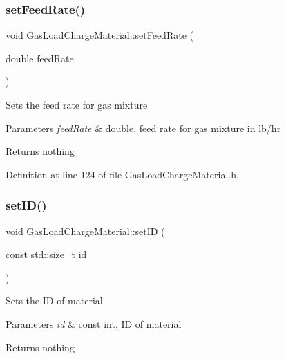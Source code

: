 \subsubsection{\texorpdfstring{set\+Feed\+Rate()}{setFeedRate()}\hspace{0.1cm}{\footnotesize\ttfamily [3/3]}}
{\footnotesize\ttfamily void Gas\+Load\+Charge\+Material\+::set\+Feed\+Rate (\begin{DoxyParamCaption}\item[{double}]{feed\+Rate }\end{DoxyParamCaption})\hspace{0.3cm}{\ttfamily [inline]}}

Sets the feed rate for gas mixture


\begin{DoxyParams}{Parameters}
{\em feed\+Rate} & double, feed rate for gas mixture in lb/hr\\
\hline
\end{DoxyParams}
\begin{DoxyReturn}{Returns}
nothing 
\end{DoxyReturn}


Definition at line 124 of file Gas\+Load\+Charge\+Material.\+h.

\mbox{\label{class_gas_load_charge_material_a24b43ba7c871453258f458a8c1f15232}} 
\subsubsection{\texorpdfstring{set\+I\+D()}{setID()}\hspace{0.1cm}{\footnotesize\ttfamily [1/3]}}
{\footnotesize\ttfamily void Gas\+Load\+Charge\+Material\+::set\+ID (\begin{DoxyParamCaption}\item[{const std\+::size\+\_\+t}]{id }\end{DoxyParamCaption})\hspace{0.3cm}{\ttfamily [inline]}}

Sets the ID of material


\begin{DoxyParams}{Parameters}
{\em id} & const int, ID of material\\
\hline
\end{DoxyParams}
\begin{DoxyReturn}{Returns}
nothing 
\end{DoxyReturn}


